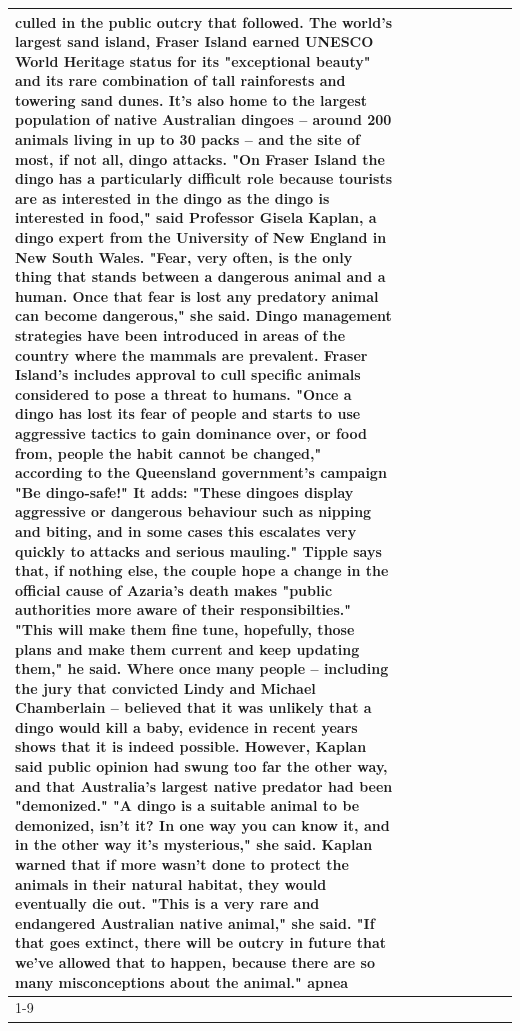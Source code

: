 \begin{table}[H]
\begin{tabular}{lllrlllll}
culled in the public outcry that followed. The world's largest sand island, Fraser Island earned UNESCO World Heritage status for its "exceptional beauty" and its rare combination of tall rainforests and towering sand dunes. It's also home to the largest population of native Australian dingoes -- around 200 animals living in up to 30 packs -- and the site of most, if not all, dingo attacks. "On Fraser Island the dingo has a particularly difficult role because tourists are as interested in the dingo as the dingo is interested in food," said Professor Gisela Kaplan, a dingo expert from the University of New England in New South Wales. "Fear, very often, is the only thing that stands between a dangerous animal and a human. Once that fear is lost any predatory animal can become dangerous," she said. Dingo management strategies have been introduced in areas of the country where the mammals are prevalent. Fraser Island's includes approval to cull specific animals considered to pose a threat to humans. "Once a dingo has lost its fear of people and starts to use aggressive tactics to gain dominance over, or food from, people the habit cannot be changed," according to the Queensland government's campaign "Be dingo-safe!" It adds: "These dingoes display aggressive or dangerous behaviour such as nipping and biting, and in some cases this escalates very quickly to attacks and serious mauling." Tipple says that, if nothing else, the couple hope a change in the official cause of Azaria's death makes "public authorities more aware of their responsibilties." "This will make them fine tune, hopefully, those plans and make them current and keep updating them," he said. Where once many people -- including the jury that convicted Lindy and Michael Chamberlain -- believed that it was unlikely that a dingo would kill a baby, evidence in recent years shows that it is indeed possible. However, Kaplan said public opinion had swung too far the other way, and that Australia's largest native predator had been "demonized." "A dingo is a suitable animal to be demonized, isn't it? In one way you can know it, and in the other way it's mysterious," she said. Kaplan warned that if more wasn't done to protect the animals in their natural habitat, they would eventually die out. "This is a very rare and endangered Australian native animal," she said. "If that goes extinct, there will be outcry in future that we've allowed that to happen, because there are so many misconceptions about the animal." apnea \\
\cline{1-9}

\end{tabular}
\end{table}
